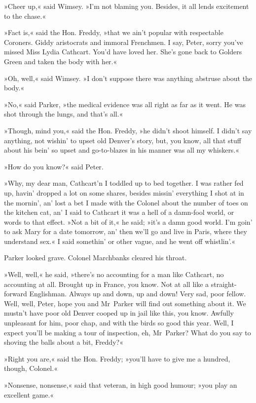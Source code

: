 »Cheer up,« said Wimsey. »I'm not blaming you. Besides, it all lends excitement to the chase.«

»Fact is,« said the Hon. Freddy, »that we ain't popular with respectable Coroners. Giddy aristocrats and immoral Frenchmen. I say, Peter, sorry you've missed Miss Lydia Cathcart. You'd have loved her. She's gone back to Golders Green and taken the body with her.«

»Oh, well,« said Wimsey. »I don't suppose there was anything abstruse about the body.«

»No,« said Parker, »the medical evidence was all right as far as it went. He was shot through the lungs, and that's all.«

»Though, mind you,« said the Hon. Freddy, »he didn't shoot himself. I didn't say anything, not wishin' to upset old Denver's story, but, you know, all that stuff about his bein' so upset and go-to-blazes in his manner was all my whiskers.«

»How do you know?« said Peter.

»Why, my dear man, Cathcart'n I toddled up to bed together. I was rather fed up, havin' dropped a lot on some shares, besides missin' everything I shot at in the mornin', an' lost a bet I made with the Colonel about the number of toes on the kitchen cat, an' I said to Cathcart it was a hell of a damn-fool world, or words to that effect. »Not a bit of it,« he said; »it's a damn good world. I'm goin' to ask Mary for a date tomorrow, an' then we'll go and live in Paris, where they understand sex.« I said somethin' or other vague, and he went off whistlin'.«

Parker looked grave. Colonel Marchbanks cleared his throat.

»Well, well,« he said, »there's no accounting for a man like Cathcart, no accounting at all. Brought up in France, you know. Not at all like a straight-forward Englishman. Always up and down, up and down! Very sad, poor fellow. Well, well, Peter, hope you and Mr~Parker will find out something about it. We mustn't have poor old Denver cooped up in jail like this, you know. Awfully unpleasant for him, poor chap, and with the birds so good this year. Well, I expect you'll be making a tour of inspection, eh, Mr~Parker? What do you say to shoving the balls about a bit, Freddy?«

»Right you are,« said the Hon. Freddy; »you'll have to give me a hundred, though, Colonel.«

»Nonsense, nonsense,« said that veteran, in high good humour; »you play an excellent game.«

